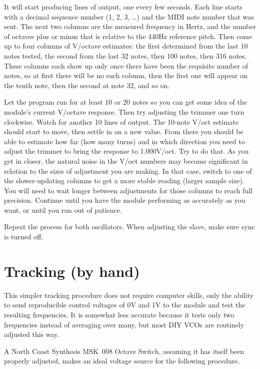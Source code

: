 It will start producing lines of output, one every few seconds.  Each
line starts with a decimal sequence number (1, 2, 3, \ldots) and the MIDI
note number that was sent.  The next two columns are the measured frequency
in Hertz, and the number of octaves plus or minus that is relative to the
440Hz reference pitch.  Then come up to four columns of V/octave estimates:
the first determined from the last 10 notes tested, the second from the last
32 notes, then 100 notes, then 316 notes.  These columns each show up only
once there have been the requisite number of notes, so at first there will
be no such column, then the first one will appear on the tenth note, then
the second at note 32, and so on.

Let the program run for at least 10 or 20 notes so you can get some idea of
the module's current V/octave response.  Then try adjusting the trimmer one
turn clockwise.  Watch for another 10 lines of output.  The 10-note V/oct
estimate should start to move, then settle in on a new value.  From there
you should be able to estimate how far (how many turns) and in which
direction you need to adjust the trimmer to bring the response to
1.000V/oct.  Try to do that.  As you get in closer, the natural noise in the
V/oct numbers may become significant in relation to the sizes of adjustment
you are making.  In that case, switch to one of the slower-updating columns
to get a more stable reading (larger sample size).  You will need to wait
longer between adjustments for those columns to reach full precision. 
Continue until you have the module performing as accurately as you want, or
until you run out of patience.

Repeat the process for both oscillators.  When adjusting the slave, make
sure sync is turned off.

\section{Tracking (by hand)}

This simpler tracking procedure does not require computer skills, only the
ability to send reproducible control voltages of 0V and 1V to the module and
test the resulting frequencies.  It is somewhat less accurate because it
tests only two frequencies instead of averaging over many, but most DIY VCOs
are routinely adjusted this way.

A North Coast Synthesis MSK~008 Octave Switch, assuming it has itself been
properly adjusted, makes an ideal voltage source for the following
procedure.

